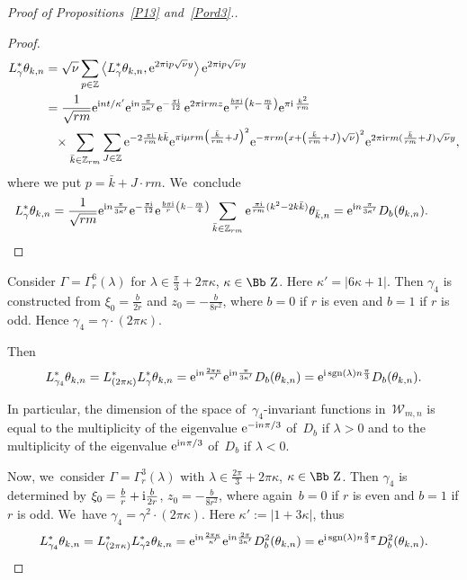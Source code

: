 \documentclass[10pt,a4paper]{amsart}
\newcommand\ZZ{{\mbox{\Bb Z}}}
\newcommand\Z{{\mathbb Z}}
\newcommand{\sgn}{\mathop{{\rm sgn}}}
\newcommand\la{\langle}
\newcommand\ra{\rangle}
\numberwithin{equation}{section}
\begin{document}
\begin{proof}[Proof of Propositions~\ref{P13} and~\ref{Pord3}.]
\begin{proof}
\begin{align*}
L^*_{\gamma} \theta_{k,n}&=\sqrt\nu \sum_{p\in\Z} \big\la L^*_{\gamma} \theta_{k,n}, {\rm e}^{2\pi {\rm i}p\sqrt\nu y}\big\ra \,{\rm e}^{2\pi {\rm i}p\sqrt\nu y}
\\
&=\frac1{\sqrt{rm}}{\rm e}^{{\rm i}nt/\kappa'}{\rm e}^{{\rm i}n\frac{\pi}{3\kappa'}}{\rm e}^{-\frac {\pi {\rm i}}{12}}\, {\rm e}^{2\pi {\rm i}rmz}{\rm e}^{\frac{b\pi {\rm i}}r\left(k-\frac m4\right)}{\rm e}^{\pi {\rm i}\,\frac{k^2}{rm}}
\\
&\phantom{=}\times \sum_{\bar k\in\Z_{rm}}\sum_{J\in\Z} {\rm e}^{-2\frac{\pi {\rm i}}{rm} k\bar k}{\rm e}^{\pi {\rm i}\mu rm\big(\frac{\bar k}{rm}+J\big)^2}{\rm e}^{-\pi rm\left(x+\left(\frac{\bar k}{rm}+J\right)\sqrt\nu\right)^2}{\rm e}^{2\pi {\rm i} rm (\frac{\bar k}{rm}+J) \sqrt\nu y},
\end{align*}
where we put $p=\bar k+J\cdot rm$. We~conclude
\begin{gather*}
L^*_{\gamma} \theta_{k,n} = \frac1{\sqrt{rm}}{\rm e}^{{\rm i}n\frac{\pi}{3\kappa'}}{\rm e}^{-\frac {\pi {\rm i}}{12}} {\rm e}^{\frac{b\pi {\rm i}}r\left(k-\frac m4\right)}
\sum_{\bar k\in \Z_{rm}} {\rm e}^{\frac{\pi {\rm i}}{rm} (k^2-2k\bar k)}\theta_{\bar k,n} = {\rm e}^{{\rm i}n\frac{\pi}{3\kappa'}} D_b(\theta_{k,n}). \tag*{\qed}
\end{gather*}
\renewcommand{\qed}{}
\end{proof}

Consider $\Gamma=\Gamma^6_r(\lambda)$ for $\lambda \in \frac\pi 3+2\pi\kappa$, $\kappa\in\ZZ$. Here $\kappa'=|6\kappa+1|$.
Then $\gamma_4$ is constructed from $\xi_0=\frac{b}{2r}$ and $z_0=-\frac{b}{8r^2}$, where $b=0$ if $r$ is even and $b=1$ if $r$ is odd. Hence $\gamma_4=\gamma\cdot(2\pi\kappa)$.

Then
\begin{gather*}
L^*_{\gamma_4} \theta_{k,n}=L^*_{(2\pi\kappa)} L^*_{\gamma}\theta_{k,n}={\rm e}^{{\rm i}n\frac{2\pi\kappa}{\kappa'}}{\rm e}^{{\rm i}n\frac{\pi}{3\kappa'}}D_b(\theta_{k,n})={\rm e}^{{\rm i}\sgn(\lambda)n\frac{\pi}{3}}D_b(\theta_{k,n}).
\end{gather*}

In particular, the dimension of the space of~$\gamma_4$-invariant functions in~${\mathcal W}_{m,n}$ is equal to the multiplicity of the eigenvalue ${\rm e}^{-{\rm i}n\pi/3}$ of~$D_b$ if $\lambda>0$ and to the multiplicity of the eigenvalue ${\rm e}^{{\rm i}n\pi/3}$ of~$D_b$ if $\lambda<0$.

Now, we~consider $\Gamma=\Gamma^3_r(\lambda)$ with $\lambda \in \frac{2\pi} 3+2\pi\kappa$, $\kappa\in\ZZ$. Then $\gamma_4$ is determined by $\xi_0=\frac{b}{r}+{\rm i}\frac{b}{2r}$, $z_0=-\frac{b}{8r^2}$, where again~$b=0$ if $r$ is even and $b=1$ if $r$ is odd. We~have $\gamma_4=\gamma^2\cdot(2\pi\kappa)$.
Here $\kappa':=|1+3\kappa|$, thus
\begin{gather*}
L^*_{\gamma_4} \theta_{k,n}=L^*_{(2\pi\kappa)} L^*_{\gamma^2}\theta_{k,n}={\rm e}^{{\rm i}n\frac{2\pi\kappa}{\kappa'}}{\rm e}^{{\rm i}n\frac{2\pi}{3\kappa'}}D_b^2(\theta_{k,n})={\rm e}^{{\rm i}\sgn(\lambda)n\frac{2}{3}\pi}D_b^2(\theta_{k,n}).
\end{gather*}


\end{proof}
\end{document}

